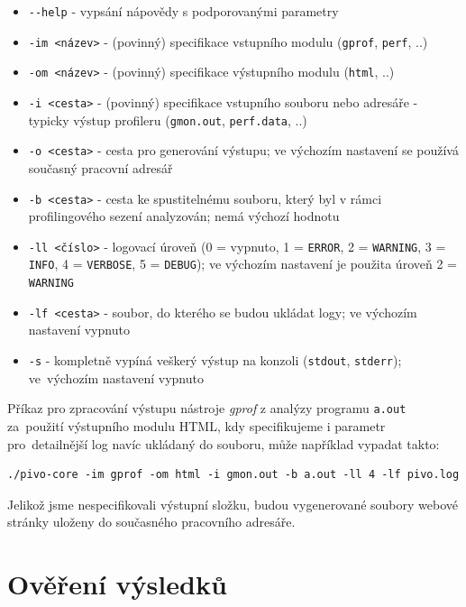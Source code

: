 \documentclass[czech,BP]{thesiskiv}
\begin{document}
\begin{itemize}
\item \texttt{-{}-help} - vypsání nápovědy s podporovanými parametry
\item \texttt{-im <název>} - (povinný) specifikace vstupního modulu (\texttt{gprof}, \texttt{perf}, ..)
\item \texttt{-om <název>} - (povinný) specifikace výstupního modulu (\texttt{html}, ..)
\item \texttt{-i <cesta>} - (povinný) specifikace vstupního souboru nebo adresáře - typicky výstup profileru (\texttt{gmon.out}, \texttt{perf.data}, ..)
\item \texttt{-o <cesta>} - cesta pro generování výstupu; ve výchozím nastavení se používá současný pracovní adresář
\item \texttt{-b <cesta>} - cesta ke spustitelnému souboru, který byl v rámci profilingového sezení analyzován; nemá výchozí hodnotu
\item \texttt{-ll <číslo>} - logovací úroveň (0 = vypnuto, 1 = \texttt{ERROR}, 2 = \texttt{WARNING}, 3 = \texttt{INFO}, 4 = \texttt{VERBOSE}, 5 = \texttt{DEBUG}); ve výchozím nastavení je použita úroveň 2 = \texttt{WARNING}
\item \texttt{-lf <cesta>} - soubor, do kterého se budou ukládat logy; ve výchozím nastavení vypnuto
\item \texttt{-s} - kompletně vypíná veškerý výstup na konzoli (\texttt{stdout}, \texttt{stderr}); ve~výchozím nastavení vypnuto
\end{itemize}

Příkaz pro zpracování výstupu nástroje \emph{gprof} z analýzy programu \texttt{a.out} za~použití výstupního modulu HTML, kdy specifikujeme i parametr pro~detailnější log navíc ukládaný do souboru, může například vypadat takto:

\lstset{escapechar=@,style=custombash}
\begin{lstlisting}
./pivo-core -im gprof -om html -i gmon.out -b a.out -ll 4 -lf pivo.log
\end{lstlisting}

Jelikož jsme nespecifikovali výstupní složku, budou vygenerované soubory webové stránky uloženy do současného pracovního adresáře.



\chapter{Ověření výsledků}
\end{document}
